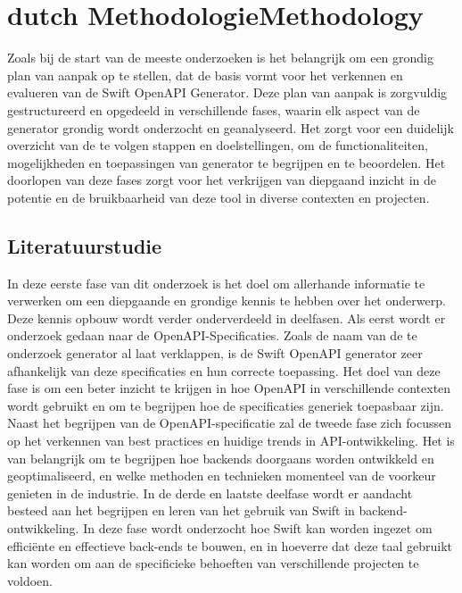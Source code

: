 
\chapter
{\IfLanguageName
    {dutch}
    {Methodologie}{Methodology}}%
\label{ch:methodologie}

Zoals bij de start van de meeste onderzoeken is het belangrijk om een grondig plan van aanpak op 
te stellen, dat de basis vormt voor het verkennen en evalueren van de Swift OpenAPI Generator. 
Deze plan van aanpak is zorgvuldig gestructureerd en opgedeeld in verschillende fases, waarin elk aspect van de generator grondig wordt onderzocht en geanalyseerd. 
Het zorgt voor een duidelijk overzicht van de te volgen stappen en doelstellingen, om de functionaliteiten, mogelijkheden en toepassingen van generator te begrijpen en te beoordelen. 
Het doorlopen van deze fases zorgt voor het verkrijgen van diepgaand inzicht in de potentie en de bruikbaarheid van deze tool in diverse contexten en projecten. 

\section{Literatuurstudie}
In deze eerste fase van dit onderzoek is het doel om allerhande informatie te verwerken om een diepgaande en grondige kennis te hebben over het onderwerp. Deze kennis opbouw wordt verder onderverdeeld in deelfasen. Als eerst wordt er onderzoek gedaan naar de OpenAPI-Specificaties. Zoals de naam van de te onderzoek generator al laat verklappen, is de Swift OpenAPI generator zeer afhankelijk van deze specificaties en hun correcte toepassing. Het doel van deze fase is om een beter inzicht te krijgen in hoe OpenAPI in verschillende contexten wordt gebruikt en om te begrijpen hoe de specificaties generiek toepasbaar zijn. Naast het begrijpen van de OpenAPI-specificatie zal de tweede fase zich focussen op het verkennen van best practices en huidige trends in API-ontwikkeling. Het is van belangrijk om te begrijpen hoe backends doorgaans worden ontwikkeld en geoptimaliseerd, en welke methoden en technieken momenteel van de voorkeur genieten in de industrie. In de derde en laatste deelfase wordt er aandacht besteed aan het begrijpen en leren van het gebruik van Swift in backend-ontwikkeling. In deze fase wordt onderzocht hoe Swift kan worden ingezet om efficiënte en effectieve back-ends te bouwen, en in hoeverre dat deze taal gebruikt kan worden om aan de specificieke behoeften van verschillende projecten te voldoen. 

